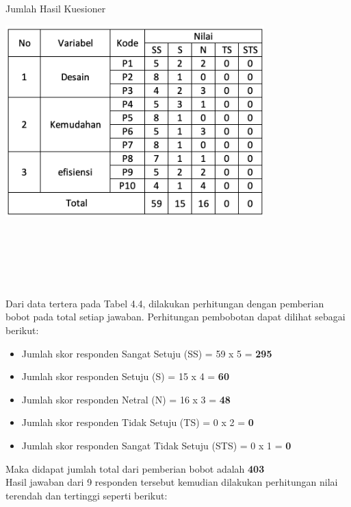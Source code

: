 \begin{flushleft}
\begin{justify}
        \begin{table}[ht]
            \centering
            \caption{Jumlah Hasil Kuesioner}
            \includegraphics[width=10cm]{images/bab 4/hitungan.png}\\
            \end{table}
            \newline \noindent \\\\\\\\
            \vspace{5cm}
            \noindent \\Dari data tertera pada Tabel 4.4, dilakukan perhitungan dengan pemberian bobot pada total setiap jawaban.
            Perhitungan pembobotan dapat dilihat sebagai berikut:
            \begin{itemize}
                \item Jumlah skor responden Sangat Setuju (SS) = 59 x 5 = \textbf{295}
                \item Jumlah skor responden Setuju (S)  = 15 x 4 = \textbf{60}
                \item Jumlah skor responden Netral (N)  = 16 x 3 = \textbf{48}
                \item Jumlah skor responden Tidak Setuju (TS)  = 0 x 2 = \textbf{0}
                \item Jumlah skor responden Sangat Tidak Setuju (STS)  = 0 x 1 = \textbf{0}
            \end{itemize}
            Maka didapat jumlah total dari pemberian bobot adalah \textbf{403}\\
            Hasil jawaban dari 9 responden tersebut kemudian dilakukan perhitungan nilai terendah dan tertinggi seperti berikut:
            \begin{itemize}

\end{itemize}
\end{justify}
\end{flushleft}
